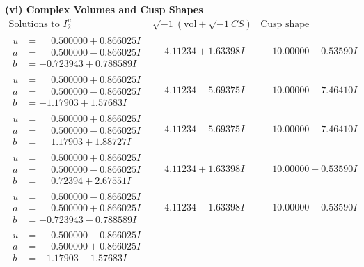 \documentclass[1p]{elsarticle_modified}
\theoremstyle{definition}
\newcommand{\I}{\sqrt{-1}}
\begin{document}
\newpage\flushleft \textbf{(vi) Complex Volumes and Cusp Shapes}
$$\begin{array}{c|c|c}  
\text{Solutions to }I^u_{2}& \I (\text{vol} + \sqrt{-1}CS) & \text{Cusp shape}\\
 \hline 
\begin{aligned}
u &= \phantom{-}0.500000 + 0.866025 I \\
a &= \phantom{-}0.500000 - 0.866025 I \\
b &= -0.723943 + 0.788589 I\end{aligned}
 & \phantom{-}4.11234 + 1.63398 I & \phantom{-}10.00000 - 0.53590 I \\ \hline\begin{aligned}
u &= \phantom{-}0.500000 + 0.866025 I \\
a &= \phantom{-}0.500000 - 0.866025 I \\
b &= -1.17903 + 1.57683 I\end{aligned}
 & \phantom{-}4.11234 - 5.69375 I & \phantom{-}10.00000 + 7.46410 I \\ \hline\begin{aligned}
u &= \phantom{-}0.500000 + 0.866025 I \\
a &= \phantom{-}0.500000 - 0.866025 I \\
b &= \phantom{-}1.17903 + 1.88727 I\end{aligned}
 & \phantom{-}4.11234 - 5.69375 I & \phantom{-}10.00000 + 7.46410 I \\ \hline\begin{aligned}
u &= \phantom{-}0.500000 + 0.866025 I \\
a &= \phantom{-}0.500000 - 0.866025 I \\
b &= \phantom{-}0.72394 + 2.67551 I\end{aligned}
 & \phantom{-}4.11234 + 1.63398 I & \phantom{-}10.00000 - 0.53590 I \\ \hline\begin{aligned}
u &= \phantom{-}0.500000 - 0.866025 I \\
a &= \phantom{-}0.500000 + 0.866025 I \\
b &= -0.723943 - 0.788589 I\end{aligned}
 & \phantom{-}4.11234 - 1.63398 I & \phantom{-}10.00000 + 0.53590 I \\ \hline\begin{aligned}
u &= \phantom{-}0.500000 - 0.866025 I \\
a &= \phantom{-}0.500000 + 0.866025 I \\
b &= -1.17903 - 1.57683 I\end{aligned}

\end{array}$$
\end{document}
